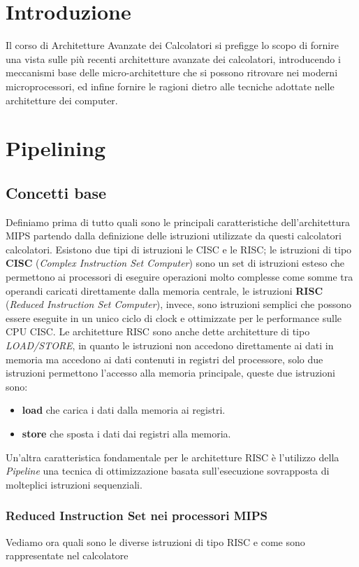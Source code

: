 \section*{Introduzione}
Il corso di Architetture Avanzate dei Calcolatori si prefigge lo scopo di fornire una vista sulle più recenti architetture avanzate dei calcolatori, introducendo i meccanismi base delle micro-architetture che si possono ritrovare nei moderni microprocessori, ed infine fornire le ragioni dietro alle tecniche adottate nelle architetture dei computer.
\section{Pipelining}\label{capitolo1}
\subsection{Concetti base}
Definiamo prima di tutto quali sono le principali caratteristiche dell'architettura MIPS partendo dalla definizione delle istruzioni utilizzate da questi calcolatori calcolatori.
Esistono due tipi di istruzioni le CISC e le RISC; le istruzioni di tipo \textbf{CISC} (\emph{Complex Instruction Set Computer}) sono un set di istruzioni esteso che permettono ai processori di eseguire operazioni molto complesse come somme tra operandi caricati direttamente dalla memoria centrale, le istruzioni \textbf{RISC} (\emph{Reduced Instruction Set Computer}), invece, sono istruzioni semplici che possono essere eseguite in un unico ciclo di clock e ottimizzate per le performance sulle CPU CISC.
Le architetture RISC sono anche dette architetture di tipo \emph{LOAD/STORE}, in quanto le istruzioni non accedono direttamente ai dati in memoria ma accedono ai dati contenuti in registri del processore, solo due istruzioni permettono l'accesso alla memoria principale, queste due istruzioni sono: 
\begin{itemize}
\item \textbf{load} che carica i dati dalla memoria ai registri.
\item \textbf{store} che sposta i dati dai registri alla memoria.
\end{itemize}
Un'altra caratteristica fondamentale per le architetture RISC è l'utilizzo della \emph{Pipeline} una tecnica di ottimizzazione basata sull'esecuzione sovrapposta di molteplici istruzioni sequenziali.
\subsubsection{Reduced Instruction Set nei processori MIPS}
Vediamo ora quali sono le diverse istruzioni di tipo RISC e come sono rappresentate nel calcolatore
